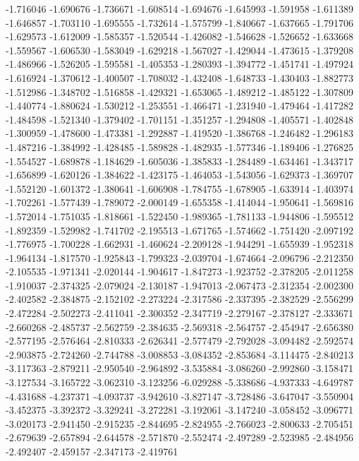 -1.716046
-1.690676
-1.736671
-1.608514
-1.694676
-1.645993
-1.591958
-1.611389
-1.646857
-1.703110
-1.695555
-1.732614
-1.575799
-1.840667
-1.637665
-1.791706
-1.629573
-1.612009
-1.585357
-1.520544
-1.426082
-1.546628
-1.526652
-1.633668
-1.559567
-1.606530
-1.583049
-1.629218
-1.567027
-1.429044
-1.473615
-1.379208
-1.486966
-1.526205
-1.595581
-1.405353
-1.280393
-1.394772
-1.451741
-1.497924
-1.616924
-1.370612
-1.400507
-1.708032
-1.432408
-1.648733
-1.430403
-1.882773
-1.512986
-1.348702
-1.516858
-1.429321
-1.653065
-1.489212
-1.485122
-1.307809
-1.440774
-1.880624
-1.530212
-1.253551
-1.466471
-1.231940
-1.479464
-1.417282
-1.484598
-1.521340
-1.379402
-1.701151
-1.351257
-1.294808
-1.405571
-1.402848
-1.300959
-1.478600
-1.473381
-1.292887
-1.419520
-1.386768
-1.246482
-1.296183
-1.487216
-1.384992
-1.428485
-1.589828
-1.482935
-1.577346
-1.189406
-1.276825
-1.554527
-1.689878
-1.184629
-1.605036
-1.385833
-1.284489
-1.634461
-1.343717
-1.656899
-1.620126
-1.384622
-1.423175
-1.464053
-1.543056
-1.629373
-1.369707
-1.552120
-1.601372
-1.380641
-1.606908
-1.784755
-1.678905
-1.633914
-1.403974
-1.702261
-1.577439
-1.789072
-2.000149
-1.655358
-1.414044
-1.950641
-1.569816
-1.572014
-1.751035
-1.818661
-1.522450
-1.989365
-1.781133
-1.944806
-1.595512
-1.892359
-1.529982
-1.741702
-2.195513
-1.671765
-1.574662
-1.751420
-2.097192
-1.776975
-1.700228
-1.662931
-1.460624
-2.209128
-1.944291
-1.655939
-1.952318
-1.964134
-1.817570
-1.925843
-1.799323
-2.039704
-1.674664
-2.096796
-2.212350
-2.105535
-1.971341
-2.020144
-1.904617
-1.847273
-1.923752
-2.378205
-2.011258
-1.910037
-2.374325
-2.079024
-2.130187
-1.947013
-2.067473
-2.312354
-2.002300
-2.402582
-2.384875
-2.152102
-2.273224
-2.317586
-2.337395
-2.382529
-2.556299
-2.472284
-2.502273
-2.411041
-2.300352
-2.347719
-2.279167
-2.378127
-2.333671
-2.660268
-2.485737
-2.562759
-2.384635
-2.569318
-2.564757
-2.454947
-2.656380
-2.577195
-2.576464
-2.810333
-2.626341
-2.577479
-2.792028
-3.094482
-2.592574
-2.903875
-2.724260
-2.744788
-3.008853
-3.084352
-2.853684
-3.114475
-2.840213
-3.117363
-2.879211
-2.950540
-2.964892
-3.535884
-3.086260
-2.992860
-3.158471
-3.127534
-3.165722
-3.062310
-3.123256
-6.029288
-5.338686
-4.937333
-4.649787
-4.431688
-4.237371
-4.093737
-3.942610
-3.827147
-3.728486
-3.647047
-3.550904
-3.452375
-3.392372
-3.329241
-3.272281
-3.192061
-3.147240
-3.058452
-3.096771
-3.020173
-2.941450
-2.915235
-2.844695
-2.824955
-2.766023
-2.800633
-2.705451
-2.679639
-2.657894
-2.644578
-2.571870
-2.552474
-2.497289
-2.523985
-2.484956
-2.492407
-2.459157
-2.347173
-2.419761
